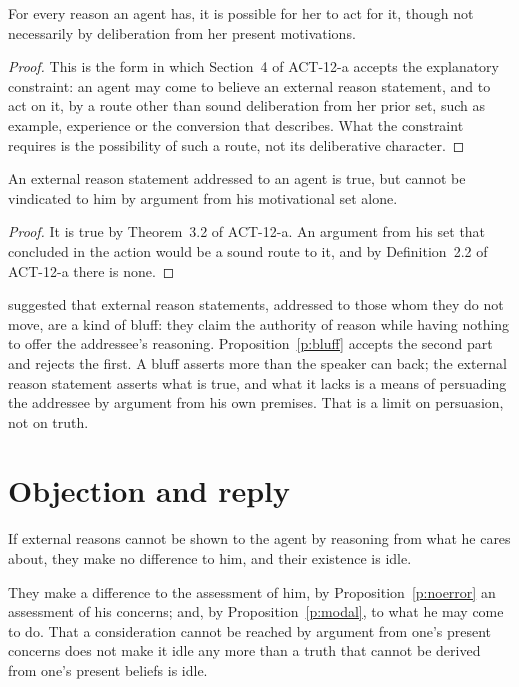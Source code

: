 \documentclass{situationist-preprint}
\begin{document}
\begin{proposition}\label{p:modal}
For every reason an agent has, it is possible for her to act for it, though not necessarily by deliberation from her present motivations.
\end{proposition}

\begin{proof}
This is the form in which Section~4 of ACT-12-a accepts the explanatory constraint: an agent may come to believe an external reason statement, and to act on it, by a route other than sound deliberation from her prior set, such as example, experience or the conversion that \citet{McDowell1995} describes. What the constraint requires is the possibility of such a route, not its deliberative character.
\end{proof}

\begin{proposition}\label{p:bluff}
An external reason statement addressed to an agent is true, but cannot be vindicated to him by argument from his motivational set alone.
\end{proposition}

\begin{proof}
It is true by Theorem~3.2 of ACT-12-a. An argument from his set that concluded in the action would be a sound route to it, and by Definition~2.2 of ACT-12-a there is none.
\end{proof}

\citet{Williams1995} suggested that external reason statements, addressed to those whom they do not move, are a kind of bluff: they claim the authority of reason while having nothing to offer the addressee's reasoning. Proposition~\ref{p:bluff} accepts the second part and rejects the first. A bluff asserts more than the speaker can back; the external reason statement asserts what is true, and what it lacks is a means of persuading the addressee by argument from his own premises. That is a limit on persuasion, not on truth.

\section{Objection and reply}

\begin{objection}
If external reasons cannot be shown to the agent by reasoning from what he cares about, they make no difference to him, and their existence is idle.
\end{objection}

\begin{reply}
They make a difference to the assessment of him, by Proposition~\ref{p:noerror} an assessment of his concerns; and, by Proposition~\ref{p:modal}, to what he may come to do. That a consideration cannot be reached by argument from one's present concerns does not make it idle any more than a truth that cannot be derived from one's present beliefs is idle.
\end{reply}
\end{document}
